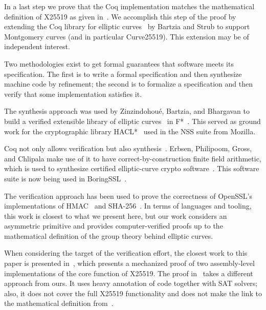 In a last step we prove that the Coq implementation matches
the mathematical definition of X25519 as given in~\cite[Sec.~2]{Ber06}.
We accomplish this step of the proof by extending the Coq library
for elliptic curves~\cite{BartziaS14} by Bartzia and Strub to
support Montgomery curves (and in particular Curve25519).
This extension may be of independent interest.

Two methodologies exist to get formal guarantees that software meets its specification.
The first is to write a formal specification and then synthesize
machine code by refinement; the second is to formalize 
a specification and then verify that some
implementation satisfies it.

The synthesis approach was used by Zinzindohou{\'{e}}, Bartzia, and Bhargavan to build a verified extensible
library of elliptic curves~\cite{Zinzindohoue2016AVE} in F*~\cite{DBLP:journals/corr/BhargavanDFHPRR17}.
This served as ground work for the cryptographic library HACL*~\cite{zinzindohoue2017hacl}
used in the NSS suite from Mozilla.

Coq not only allows verification but also synthesis~\cite{CpdtJFR}.
Erbsen, Philipoom, Gross, and Chlipala make use of it to have
correct-by-construction finite field arithmetic, which is used
to synthesize certified elliptic-curve crypto software~\cite{Philipoom2018CorrectbyconstructionFF,Erbsen2017CraftingCE,Erbsen2016SystematicSO}.
This software suite is now being used in BoringSSL~\cite{fiat-crypto}.

The verification approach has been used to prove the correctness of OpenSSL's
implementations of HMAC~\cite{Beringer2015VerifiedCA} and SHA-256~\cite{2015-Appel}. 
In terms of languages and tooling, this work is closest to what we present here,
but our work considers an asymmetric primitive and provides computer-verified
proofs up to the mathematical definition of the group theory behind elliptic curves.

When considering the target of the verification effort, the closest work
to this paper is presented in~\cite{Chen2014VerifyingCS}, which presents
a mechanized proof of two assembly-level implementations of the core function of X25519.
The proof in~\cite{Chen2014VerifyingCS} takes a different approach from ours. 
It uses heavy annotation of code together with SAT solvers; 
also, it does not cover the full X25519 functionality and does
not make the link to the mathematical definition from~\cite{Ber06}.

